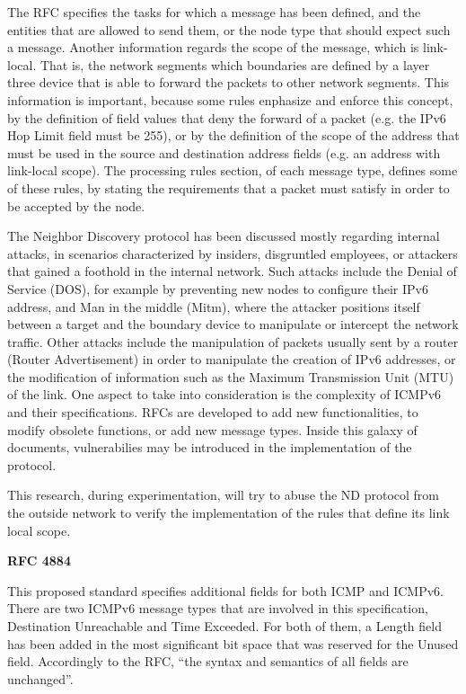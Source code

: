 \documentclass[12pt]{article}
\begin{document}
The RFC specifies the tasks for which a message has been defined, and the entities that are allowed to send them, or the node type that should expect such a message. Another information regards the scope of the message, which is link-local. That is, the network segments which boundaries are defined by a layer three device that is able to forward the packets to other network segments. This information is important, because some rules enphasize and enforce this concept, by the definition of field values that deny the forward of a packet (e.g. the IPv6 Hop Limit field must be 255), or by the definition of the scope of the address that must be used in the source and destination address fields (e.g. an address with link-local scope). The processing rules section, of each message type, defines some of these rules, by stating the requirements that a packet must satisfy in order to be accepted by the node.

The Neighbor Discovery protocol has been discussed mostly regarding internal attacks, in scenarios characterized by insiders, disgruntled employees, or attackers that gained a foothold in the internal network. Such attacks include the Denial of Service (DOS), for example by preventing new nodes to configure their IPv6 address, and Man in the middle (Mitm), where the attacker positions itself between a target and the boundary device to manipulate or intercept the network traffic. Other attacks include the manipulation of packets usually sent by a router (Router Advertisement) in order to manipulate the creation of IPv6 addresses, or the modification of information such as the Maximum Transmission Unit (MTU) of the link. One aspect to take into consideration is the complexity of ICMPv6 and their specifications. RFCs are developed to add new functionalities, to modify obsolete functions, or add new message types. Inside this galaxy of documents, vulnerabilies may be introduced in the implementation of the protocol\cite{schaefer}.

This research, during experimentation, will try to abuse the ND protocol from the outside network to verify the implementation of the rules that define its link local scope.

\textbf{RFC 4884}

This proposed standard specifies additional fields for both ICMP and ICMPv6. There are two ICMPv6 message types that are involved in this specification, Destination Unreachable and Time Exceeded. For both of them, a Length field has been added in the most significant bit space that was reserved for the Unused field. Accordingly to the RFC, ``the syntax and semantics of all fields are unchanged''\cite{rfc4884}.
\end{document}
